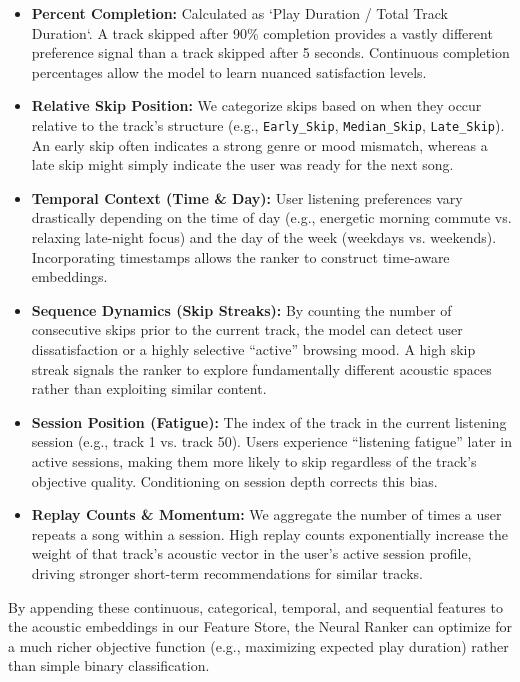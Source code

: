 \documentclass[12pt, letterpaper]{article}
\begin{document}
\begin{itemize}
    \item \textbf{Percent Completion:} Calculated as `Play Duration / Total Track Duration`. A track skipped after 90\% completion provides a vastly different preference signal than a track skipped after 5 seconds. Continuous completion percentages allow the model to learn nuanced satisfaction levels.
    \item \textbf{Relative Skip Position:} We categorize skips based on when they occur relative to the track's structure (e.g., \texttt{Early\_Skip}, \texttt{Median\_Skip}, \texttt{Late\_Skip}). An early skip often indicates a strong genre or mood mismatch, whereas a late skip might simply indicate the user was ready for the next song.
    \item \textbf{Temporal Context (Time \& Day):} User listening preferences vary drastically depending on the time of day (e.g., energetic morning commute vs. relaxing late-night focus) and the day of the week (weekdays vs. weekends). Incorporating timestamps allows the ranker to construct time-aware embeddings.
    \item \textbf{Sequence Dynamics (Skip Streaks):} By counting the number of consecutive skips prior to the current track, the model can detect user dissatisfaction or a highly selective ``active'' browsing mood. A high skip streak signals the ranker to explore fundamentally different acoustic spaces rather than exploiting similar content.
    \item \textbf{Session Position (Fatigue):} The index of the track in the current listening session (e.g., track 1 vs. track 50). Users experience ``listening fatigue'' later in active sessions, making them more likely to skip regardless of the track's objective quality. Conditioning on session depth corrects this bias.
    \item \textbf{Replay Counts \& Momentum:} We aggregate the number of times a user repeats a song within a session. High replay counts exponentially increase the weight of that track's acoustic vector in the user's active session profile, driving stronger short-term recommendations for similar tracks.
\end{itemize}

By appending these continuous, categorical, temporal, and sequential features to the acoustic embeddings in our Feature Store, the Neural Ranker can optimize for a much richer objective function (e.g., maximizing expected play duration) rather than simple binary classification.
\end{document}
